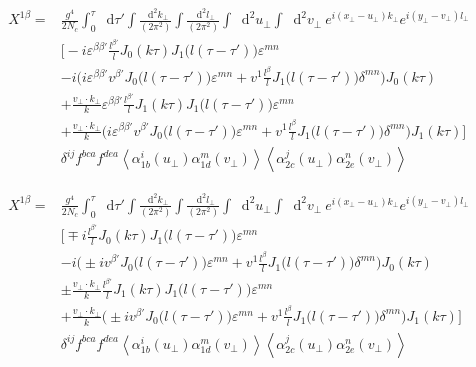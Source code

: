 \documentclass[12pt]{article}
\newcommand*\diff{\mathop{}\!\mathrm{d}}
\begin{document}
\begin{equation*}
\begin{split}
 X^{1 \beta} = &
\frac{g^4}{2 N_c}
\int_0^\tau \diff \tau'
\int \frac{\diff^2 k_\perp}{(2\pi^2)}
\int \frac{\diff^2 l_\perp}{(2\pi^2)}
\int \diff^2 u_\perp
\int \diff^2 v_\perp ~
e^{i (x_\perp - u_\perp) k_\perp}
e^{i (y_\perp - v_\perp) l_\perp} \\
& \bigg[ - i \varepsilon^{\beta \beta'} \frac{l^{\beta'}}{l} J_0(k \tau) J_1\big(l (\tau-\tau')\big) \varepsilon^{mn}  \\
& - i \Big(i \varepsilon^{\beta \beta'} v^{\beta'} J_0\big(l(\tau-\tau')\big) \varepsilon^{mn} + v^1 \frac{l^\beta}{l} J_1\big(l(\tau-\tau') \big) \delta^{mn} \Big) J_0(k \tau)  \\
& + \frac{v_\perp \cdot k_\perp}{k} \varepsilon^{\beta \beta'} \frac{l^{\beta'}}{l} J_1(k\tau) J_1\big(l(\tau-\tau')\big) \varepsilon^{mn}  \\
& + \frac{v_\perp \cdot k_\perp}{k} \Big( i \varepsilon^{\beta \beta'} v^{\beta'} J_0\big(l(\tau-\tau')\big) \varepsilon^{mn} + v^1 \frac{l^\beta}{l} J_1\big(l(\tau-\tau') \big) \delta^{mn} \Big) J_1 (k\tau) \bigg]\\
& \delta^{ij}  f^{bca} f^{dea}
\left< \alpha^i_{1b} (u_\perp) \alpha^m_{1d} (v_\perp) \right>  \left< \alpha^j_{2c} (u_\perp) \alpha^n_{2e} (v_\perp) \right>
\end{split}
\end{equation*}

\begin{equation*}
\begin{split}
 X^{1 \beta} = &
\frac{g^4}{2 N_c}
\int_0^\tau \diff \tau'
\int \frac{\diff^2 k_\perp}{(2\pi^2)}
\int \frac{\diff^2 l_\perp}{(2\pi^2)}
\int \diff^2 u_\perp
\int \diff^2 v_\perp ~
e^{i (x_\perp - u_\perp) k_\perp}
e^{i (y_\perp - v_\perp) l_\perp} \\
& \bigg[ \mp i  \frac{l^{\beta'}}{l} J_0(k \tau) J_1\big(l (\tau-\tau')\big) \varepsilon^{mn}  \\
& - i \Big( \pm i  v^{\beta'} J_0\big(l(\tau-\tau')\big) \varepsilon^{mn} + v^1 \frac{l^\beta}{l} J_1\big(l(\tau-\tau') \big) \delta^{mn} \Big) J_0(k \tau) \\
& \pm \frac{v_\perp \cdot k_\perp}{k}  \frac{l^{\beta'}}{l} J_1(k\tau) J_1\big(l(\tau-\tau')\big) \varepsilon^{mn}  \\
& + \frac{v_\perp \cdot k_\perp}{k} \Big( \pm i v^{\beta'} J_0\big(l(\tau-\tau')\big) \varepsilon^{mn} + v^1 \frac{l^\beta}{l} J_1\big(l(\tau-\tau') \big) \delta^{mn} \Big) J_1 (k\tau) \bigg]\\
& \delta^{ij} f^{bca} f^{dea}
\left< \alpha^i_{1b} (u_\perp) \alpha^m_{1d} (v_\perp) \right>  \left< \alpha^j_{2c} (u_\perp) \alpha^n_{2e} (v_\perp) \right>
\end{split}
\end{equation*}
\end{document}
